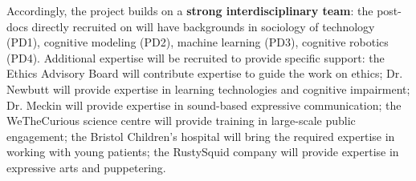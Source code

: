Accordingly, the project builds on a \textbf{strong interdisciplinary team}: the
post-docs directly recruited on \project will have backgrounds in sociology of
technology (PD1), cognitive modeling (PD2), machine learning (PD3), cognitive
robotics (PD4). Additional expertise will be recruited to provide specific
support: the \project Ethics Advisory Board will contribute expertise to guide
the work on ethics; Dr. Newbutt will provide expertise in learning technologies
and cognitive impairment; Dr. Meckin will provide expertise in sound-based
expressive communication; the WeTheCurious science centre will provide training in
large-scale public engagement; the Bristol Children's hospital will bring the
required expertise in working with young patients; the RustySquid company will provide expertise in
expressive arts and puppetering.

%
%
%
%
%


